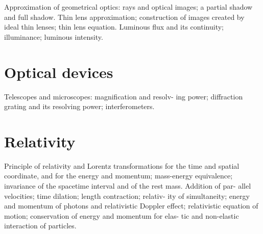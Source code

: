 Approximation of geometrical optics: rays and optical images; a partial shadow and full shadow. 
Thin lens approximation; construction of images created by ideal thin lenses; thin lens equation.
Luminous flux and its continuity; illuminance; luminous intensity.
\pagebreak

\chapter{Optical devices}
Telescopes and microscopes: magnification and resolv-
ing power; diffraction grating and its resolving power;
interferometers.

\chapter{Relativity}
Principle of relativity and Lorentz transformations for
the time and spatial coordinate, and for the energy and
momentum; mass-energy equivalence; invariance of the
spacetime interval and of the rest mass. Addition of par-
allel velocities; time dilation; length contraction; relativ-
ity of simultaneity; energy and momentum of photons
and relativistic Doppler effect; relativistic equation of
motion; conservation of energy and momentum for elas-
tic and non-elastic interaction of particles.



